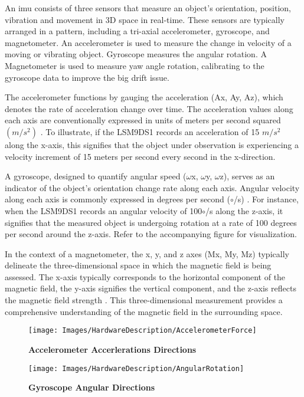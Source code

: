 An \ac{imu} consists of three sensors that measure an object's orientation, position, vibration and movement in 3D space in real-time. These sensors are typically arranged in a pattern, including a tri-axial accelerometer, gyroscope, and magnetometer\cite{Ahmad:2013}. An accelerometer is used to measure the change in velocity of a moving or vibrating object\cite{Ahmad:2013}. Gyroscope measures the angular rotation\cite{Ahmad:2013}. A Magnetometer is used to measure yaw angle rotation, calibrating to the gyroscope data to improve the big drift issue\cite{Ahmad:2013}. 

The accelerometer functions by gauging the acceleration (Ax, Ay, Az), which denotes the rate of acceleration change over time. The acceleration values along each axis are conventionally expressed in units of meters per second squared $(m/s^2)$ \cite{Vernier:2023}. To illustrate, if the LSM9DS1 records an acceleration of 15 $m/s^2$ along the x-axis, this signifies that the object under observation is experiencing a velocity increment of 15 meters per second every second in the x-direction.

A gyroscope, designed to quantify angular speed ($\omega$x, $\omega$y, $\omega$z), serves as an indicator of the object's orientation change rate along each axis. Angular velocity along each axis is commonly expressed in degrees per second ($\circ$/s) \cite{Zhuang:2020}. For instance, when the LSM9DS1 records an angular velocity of 100$\circ$/s along the z-axis, it signifies that the measured object is undergoing rotation at a rate of 100 degrees per second around the z-axis. Refer to the accompanying figure for visualization.

In the context of a magnetometer, the x, y, and z axes (Mx, My, Mz) typically delineate the three-dimensional space in which the magnetic field is being assessed. The x-axis typically corresponds to the horizontal component of the magnetic field, the y-axis signifies the vertical component, and the z-axis reflects the magnetic field strength \cite{Kostiainen:2023}. This three-dimensional measurement provides a comprehensive understanding of the magnetic field in the surrounding space.

\begin{figure}[h!]\centering
	\texttt{[image: Images/HardwareDescription/AccelerometerForce]}
	\caption{\textbf{Accelerometer Accerlerations Directions}}
	\label{fig:Acceleromter}
	\cite{Stm:2015}
\end{figure}

\begin{figure}[h!]\centering
	\texttt{[image: Images/HardwareDescription/AngularRotation]}
	\caption{\textbf{Gyroscope Angular Directions}}
	\label{fig:Gyroscope}
	\cite{Stm:2015}
\end{figure}

